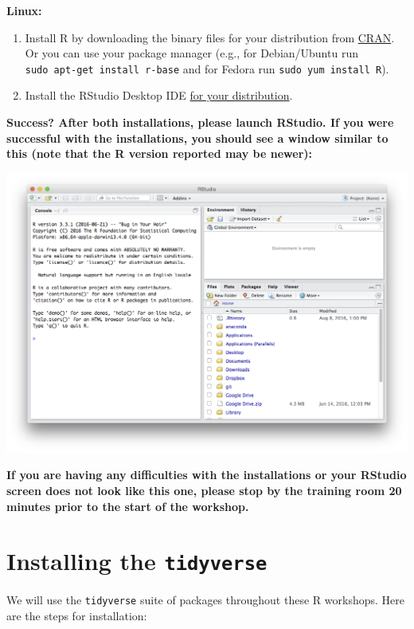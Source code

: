 \documentclass[
]{book}
\providecommand{\tightlist}{%
  \setlength{\itemsep}{0pt}\setlength{\parskip}{0pt}}
\begin{document}
\textbf{Linux:}

\begin{enumerate}
\def\labelenumi{\arabic{enumi}.}
\tightlist
\item
  Install R by downloading the binary files for your distribution from \href{http://cran.r-project.org/index.html}{CRAN}. Or you can use your package manager (e.g., for Debian/Ubuntu run \texttt{sudo\ apt-get\ install\ r-base} and for Fedora run \texttt{sudo\ yum\ install\ R}).
\item
  Install the RStudio Desktop IDE \href{https://rstudio.com/products/rstudio/download/\#download}{for your distribution}.
\end{enumerate}

\textbf{Success? After both installations, please launch RStudio. If you were successful with the installations, you should see a window similar to this (note that the R version reported may be newer):}

\includegraphics{R/Rinstall/images/rstudio_successful_install.png}

\textbf{If you are having any difficulties with the installations or your RStudio screen does not look like this one, please stop by the training room 20 minutes prior to the start of the workshop.}

\hypertarget{installing-the-tidyverse}{%
\section{\texorpdfstring{Installing the \texttt{tidyverse}}{Installing the tidyverse}}\label{installing-the-tidyverse}}

We will use the \texttt{tidyverse} suite of packages throughout these R workshops.
Here are the steps for installation:
\end{document}
